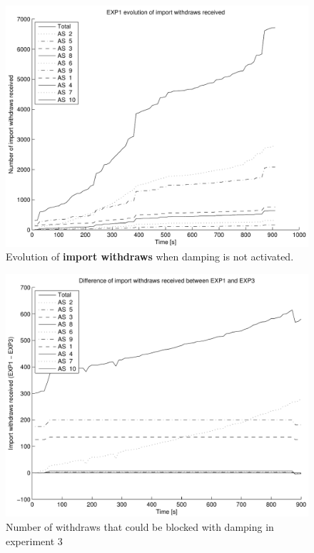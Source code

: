 \documentclass[a4paper,english]{IEEEtran}
\begin{document}
\begin{figure}
\begin{center}
\includegraphics[scale=.5]{img/exp1_withdraws.pdf}
\end{center}
\caption{Evolution of \textbf{import withdraws} when damping is not activated.}
\label{fig_exp1_withdraws}
\end{figure}

\begin{figure}
\begin{center}
\includegraphics[scale=.5]{img/diff_exp1_exp3_withdraws.pdf}
\end{center}
\caption{Number of withdraws that could be blocked with damping in experiment 3}
\label{fig_diff_withdraws}
\end{figure}
\end{document}

